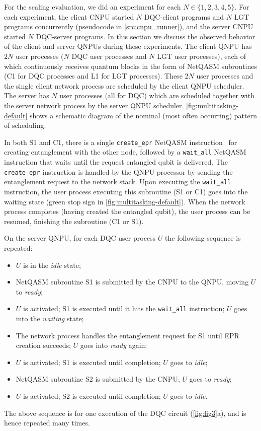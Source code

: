 For the scaling evaluation, we did an experiment for each $N \in \{1, 2, 3, 4, 5\}$. For each experiment, the client \ac{CNPU} started $N$ \ac{DQC}-client programs and $N$ \ac{LGT} programs concurrently (pseudocode in \cref{src:cnpu_runner}), and the server \ac{CNPU} started $N$ \ac{DQC}-server programs. In this section we discuss the observed behavior of the client and server \acp{QNPU} during these experiments. The client \ac{QNPU} has $2N$ user processes ($N$ \ac{DQC} user processes and $N$ LGT user processes), each of which continuously receives quantum blocks in the form of \ac{NetQASM} subroutines (C1 for \ac{DQC} processes and L1 for \ac{LGT} processes). These $2N$ user processes and the single client network process are scheduled by the client \ac{QNPU} scheduler. The server has $N$ user processes (all for \ac{DQC}) which are scheduled together with the server network process by the server \ac{QNPU} scheduler. \cref{fig:multitasking-default} shows a schematic diagram of the nominal (most often occurring) pattern of scheduling.

In both S1 and C1, there is a single \texttt{create\_epr} \ac{NetQASM} instruction~\cite{dahlberg_2022_netqasm} for creating entanglement with the other node, followed by a \texttt{wait\_all} \ac{NetQASM} instruction that waits until the request entangled qubit is delivered. The \texttt{create\_epr} instruction is handled by the \ac{QNPU} processor by sending the entanglement request to the network stack. Upon executing the \texttt{wait\_all} instruction, the user process executing this subroutine (S1 or C1) goes into the waiting state (green stop sign in \cref{fig:multitasking-default}). When the network process completes (having created the entangled qubit), the user process can be resumed, finishing the subroutine (C1 or S1). 

On the server \ac{QNPU}, for each \ac{DQC} user process $U$ the following sequence is repeated:
%
\begin{itemize}
    \item $U$ is in the \textit{idle} state;
    \item \ac{NetQASM} subroutine S1 is submitted by the \ac{CNPU} to the \ac{QNPU}, moving $U$ to \textit{ready};
    \item $U$ is activated; S1 is executed until it hits the \texttt{wait\_all} instruction; $U$ goes into the \textit{waiting} state;
    \item The network process handles the entanglement request for S1 until \ac{EPR} creation succeeds; $U$ goes into \textit{ready} again;
    \item $U$ is activated; S1 is executed until completion; $U$ goes to \textit{idle};
    \item \ac{NetQASM} subroutine S2 is submitted by the \ac{CNPU}; $U$ goes to \textit{ready};
    \item $U$ is activated; S2 is executed until completion; $U$ goes to \textit{idle}.
\end{itemize}
%
The above sequence is for one execution of the \ac{DQC} circuit (\cref{fig:fig3}a), and is hence repeated many times.

